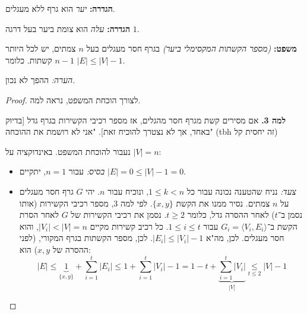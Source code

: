 \documentclass[]{article}
\newcommand\ra    {\rangle}
\newcommand\la    {\langle}
\begin{document}
	\textbf{הגדרה: }\textit{יער} הוא גרף ללא מעגלים. 
	
	\textbf{הגדרה: }\textit{עלה} הוא צומת ביער בעל דרגה $1$. 
	
	\textbf{משפט: }\textit{(מספר הקשתות המקסימלי ביער)} בגרף חסר מעגלים בעל $n$ צמתים, יש לכל היותר $n - 1$ קשתות. כלומר $|E| \le |V| - 1$. 
	
	\textit{הערה: }ההפך לא נכון. 
	\begin{proof}
		לצורך הוכחת המשפט, נראה למה. 
		
		\textbf{למה 3. }אם מסירים קשת מגרף חסר מהגלים, אז מספר רכיבי הקשירות בגרף גדל [בדיוק באחד, אך לא נצטרך להוכיח זאת]. "אני לא רושמת את ההוכחה" (tbh זה יחסית קל)
		
		נעבור להוכחת המשפט. באינדוקציה על $|V| = n$: 
		\begin{itemize}
			\item \textit{בסיס: }עבור $n = 1$, יתקיים $|E| = 0 \le |V| - 1 = 0$. 
			\item \textit{צעד: }נניח שהטענה נכונה עבור כל $1 \le k < n$, ונוכיח עבור $n$. יהי $G$ גרף חסר מעגלים על $n$ צמתים. נסיר ממנו את הקשת $\{x, y\}$. לפי למה 3, מספר רכיבי הקשירות (אותו נסמן ב־$t$) לאחר ההסרה גדל, כלומר $t \ge 2$. נסמן את רכיבי הקשירות של $G$ לאחר הסרת הקשת ב־$G_i = \la V_i, E_i \ra$ עבור $1 \le i \le t$. כל רכיב קשירות מקיים $|V_i| < |V| = n$, והוא חסר מעגלים. לכן, מה"א $|E_i| \le |V_i| - 1$. לכן, מספר הקשתות בגרף המקורי, (לפני ההסרה של $x, y$) הוא: 
			\[ |E| \le \underbrace{1}_{\{x, y\}} + \sum_{i = 1}^{t}|E_i| \le 1 + \sum_{i = 1}^{t}|V_i| - 1 = 1 - t + \underbrace{\sum_{i = 1}^{t}|V_i|}_{|V|} \underset{t \le 2}{\le} |V| - 1  \]
		\end{itemize}
	\end{proof}
\end{document}
